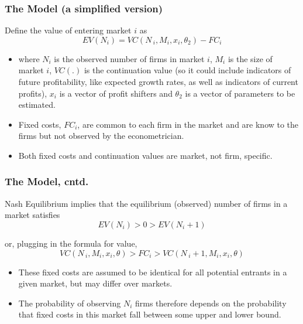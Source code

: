 \begin{frame}%

\frametitle{The Model (a simplified version)}

Define the value of entering market $i$ as 
\begin{equation}
EV(N_{i})=VC(N\,_{i},M_{i},x_{i},\theta _{2})-FC_{i}  \label{entry1}
\end{equation}

\begin{itemize}
\item where $N_{i}$ is the observed number of firms in market $i$, $M_{i}$
is the size of market $i$, $VC(.)$ is the continuation value (so it could
include indicators of future profitability, like expected growth rates, as
well as indicators of current profits), $x_{i}$ is a vector of profit
shifters and $\theta _{2}$ is a vector of parameters to be estimated.

\item Fixed costs, $FC_{i}$, are common to each firm in the market and are
know to the firms but not observed by the econometrician.

\item Both fixed costs and continuation values are market, not firm,
specific.
\end{itemize}

\end{frame}%

\begin{frame}%

\frametitle{The Model, cntd.}

Nash Equilibrium implies that the equilibrium (observed) number of firms in
a market satisfies 
\begin{equation}
EV(N_{i})>0>EV(N_{i}+1)  \label{entry2}
\end{equation}

or, plugging in the formula for value, 
\begin{equation}
VC(N\,_{i},M_{i},x_{i},\theta )>FC_{i}>VC(N\,_{i}+1,M_{i},x_{i},\theta )
\label{entry3}
\end{equation}

\begin{itemize}
\item These fixed costs are assumed to be identical for all potential
entrants in a given market, but may differ over markets.

\item The probability of observing $N_{i}$ firms therefore depends on the
probability that fixed costs in this market fall between some upper and
lower bound.
\end{itemize}

\end{frame}%

